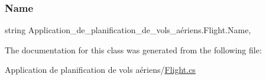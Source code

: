\subsubsection{\texorpdfstring{Name}{Name}}
{\footnotesize\ttfamily string Application\+\_\+de\+\_\+planification\+\_\+de\+\_\+vols\+\_\+aériens.\+Flight.\+Name\hspace{0.3cm}{\ttfamily [get]}, {\ttfamily [set]}}



The documentation for this class was generated from the following file\+:\begin{DoxyCompactItemize}
\item 
Application de planification de vols aériens/\hyperlink{_flight_8cs}{Flight.\+cs}\end{DoxyCompactItemize}
